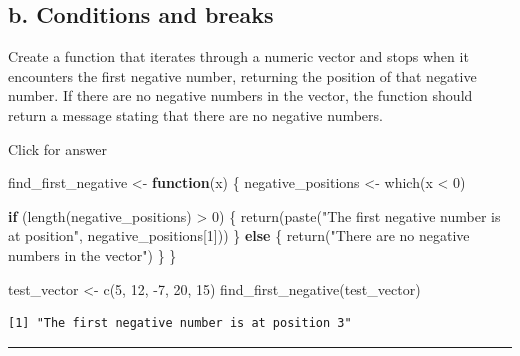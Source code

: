 \documentclass[
]{book}
\newenvironment{Shaded}{\begin{snugshade}}{\end{snugshade}}
\newcommand{\ControlFlowTok}[1]{\textcolor[rgb]{0.13,0.29,0.53}{\textbf{#1}}}
\newcommand{\DecValTok}[1]{\textcolor[rgb]{0.00,0.00,0.81}{#1}}
\newcommand{\FunctionTok}[1]{\textcolor[rgb]{0.00,0.00,0.00}{#1}}
\newcommand{\NormalTok}[1]{#1}
\newcommand{\OtherTok}[1]{\textcolor[rgb]{0.56,0.35,0.01}{#1}}
\newcommand{\SpecialCharTok}[1]{\textcolor[rgb]{0.00,0.00,0.00}{#1}}
\newcommand{\StringTok}[1]{\textcolor[rgb]{0.31,0.60,0.02}{#1}}
\begin{document}
\hypertarget{b.-conditions-and-breaks}{%
\subsection{b. Conditions and breaks}\label{b.-conditions-and-breaks}}

Create a function that iterates through a numeric vector and stops when it encounters the first negative number, returning the position of that negative number. If there are no negative numbers in the vector, the function should return a message stating that there are no negative numbers.

Click for answer

\begin{Shaded}
\begin{Highlighting}[]
\NormalTok{find\_first\_negative }\OtherTok{\textless{}{-}} \ControlFlowTok{function}\NormalTok{(x) \{}
\NormalTok{  negative\_positions }\OtherTok{\textless{}{-}} \FunctionTok{which}\NormalTok{(x }\SpecialCharTok{\textless{}} \DecValTok{0}\NormalTok{)}
  
  \ControlFlowTok{if}\NormalTok{ (}\FunctionTok{length}\NormalTok{(negative\_positions) }\SpecialCharTok{\textgreater{}} \DecValTok{0}\NormalTok{) \{}
    \FunctionTok{return}\NormalTok{(}\FunctionTok{paste}\NormalTok{(}\StringTok{"The first negative number is at position"}\NormalTok{, negative\_positions[}\DecValTok{1}\NormalTok{]))}
\NormalTok{  \} }\ControlFlowTok{else}\NormalTok{ \{}
    \FunctionTok{return}\NormalTok{(}\StringTok{"There are no negative numbers in the vector"}\NormalTok{)}
\NormalTok{  \}}
\NormalTok{\}}
\end{Highlighting}
\end{Shaded}

\begin{Shaded}
\begin{Highlighting}[]
\NormalTok{test\_vector }\OtherTok{\textless{}{-}} \FunctionTok{c}\NormalTok{(}\DecValTok{5}\NormalTok{, }\DecValTok{12}\NormalTok{, }\SpecialCharTok{{-}}\DecValTok{7}\NormalTok{, }\DecValTok{20}\NormalTok{, }\DecValTok{15}\NormalTok{)}
\FunctionTok{find\_first\_negative}\NormalTok{(test\_vector)}
\end{Highlighting}
\end{Shaded}

\begin{verbatim}
[1] "The first negative number is at position 3"
\end{verbatim}

\begin{center}\rule{0.5\linewidth}{0.5pt}\end{center}
\end{document}
